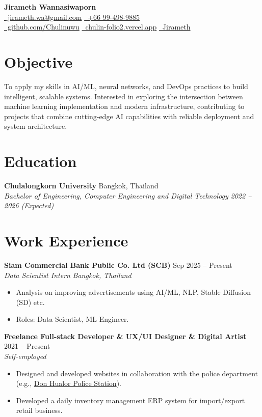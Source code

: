 \documentclass[a4paper,10pt]{article}
\newcommand{\entry}[4]{
  \vspace{1.2ex}
  \textbf{#1} \hfill #2 \\
  \textit{#3} \hfill \textit{#4} \par
}
\begin{document}
\begin{center}
    {\Huge \textbf{Jirameth Wannasiwaporn}} \\[1ex]
    \href{mailto:jirameth.wa@gmail.com}{\faEnvelope\ jirameth.wa@gmail.com} \quad
    \href{tel:+66994989885}{\faPhone\ +66 99-498-9885} \\
    \href{https://github.com/Chulinuwu}{\faGithub\ github.com/Chulinuwu} \quad
    \href{https://chulin-folio2.vercel.app/}{\faGlobe\ chulin-folio2.vercel.app} \quad
    \href{https://www.linkedin.com/in/jirameth-wannasiwaporn-734207310/}{\faLinkedin\ Jirameth}
\end{center}

\section*{Objective}
To apply my skills in AI/ML, neural networks, and DevOps practices to build intelligent, scalable systems. Interested in exploring the intersection between machine learning implementation and modern infrastructure, contributing to projects that combine cutting-edge AI capabilities with reliable deployment and system architecture.

\section*{Education}
\entry{Chulalongkorn University}{Bangkok, Thailand}{Bachelor of Engineering, Computer Engineering and Digital Technology}{2022 -- 2026 (Expected)}

\section*{Work Experience}

\entry{Siam Commercial Bank Public Co. Ltd (SCB)}{Sep 2025 -- Present}{Data Scientist Intern}{Bangkok, Thailand}
\begin{itemize}
    \item Analysis on improving advertisements using AI/ML, NLP, Stable Diffusion (SD) etc.
    \item Roles: Data Scientist, ML Engineer.
\end{itemize}

\entry{Freelance Full-stack Developer \& UX/UI Designer \& Digital Artist}{2021 -- Present}{Self-employed}{}
\begin{itemize}
    \item Designed and developed websites in collaboration with the police department (e.g., \href{https://donhualor-chonburi-police.com/}{Don Hualor Police Station}).
    \item Developed a daily inventory management ERP system for import/export retail business.
\end{itemize}
\end{document}
